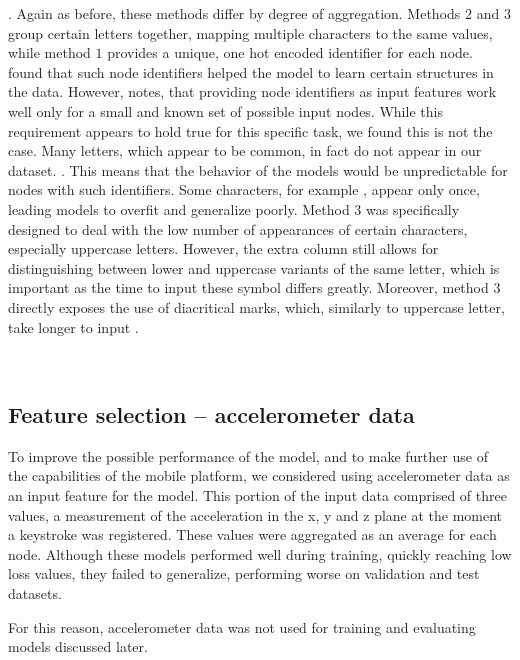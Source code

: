 .
Again as before, these methods differ by degree of aggregation. Methods $2$ and $3$ group certain letters together, mapping multiple characters to the same values, while method $1$ provides a unique, one hot encoded identifier for each node.  found that such node identifiers helped the model to learn certain structures in the data. However,  notes, that providing node identifiers as input features work well only for a small and known set of possible input nodes. While this requirement appears to hold true for this specific task, we found this is not the case. Many letters, which appear to be common, in fact do not appear in our dataset. . This means that the behavior of the models would be unpredictable for nodes with such identifiers.
Some characters, for example , appear only once, leading models to overfit and generalize poorly.
Method $3$ was specifically designed to deal with the low number of appearances of certain characters, especially uppercase letters. However, the extra column still allows for distinguishing between lower and uppercase variants of the same letter, which is important as the time to input these symbol differs greatly. 
Moreover, method $3$ directly exposes the use of diacritical marks, which, similarly to uppercase letter, take longer to input . 

\\


\subsection{Feature selection -- accelerometer data}
To improve the possible performance of the model, and to make further use of the capabilities of the mobile platform, we considered using accelerometer data as an input feature for the model.
This portion of the input data comprised of three values, a measurement of the acceleration in the x, y and z plane at the moment a keystroke was registered. 
These values were aggregated as an average for each node. Although these models performed well during training, quickly reaching low loss values, they failed to generalize, performing worse on 
validation and test datasets. 

For this reason, accelerometer data was not used for training and evaluating models discussed later.



